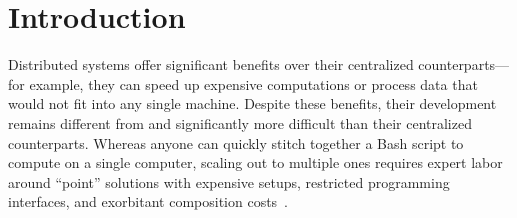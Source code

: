 \documentclass[sigplan,10pt,review,anonymous]{acmart}
\begin{document}




\maketitle


\section{Introduction}
\label{intro}

% 

Distributed systems offer significant benefits over their centralized counterparts---for example, they can speed up expensive computations or process data that would not fit into any single machine.
Despite these benefits, their development remains different from and significantly more difficult than their centralized counterparts.
Whereas anyone can quickly stitch together a Bash script to compute on a single computer, 
   scaling out to multiple ones requires expert labor around ``point'' solutions with expensive setups, restricted programming interfaces, and exorbitant composition costs~\cite{taurus:14, dios:13, andromeda:15, pywren:17, futuredata:18, nefele:18}.
\end{document}
